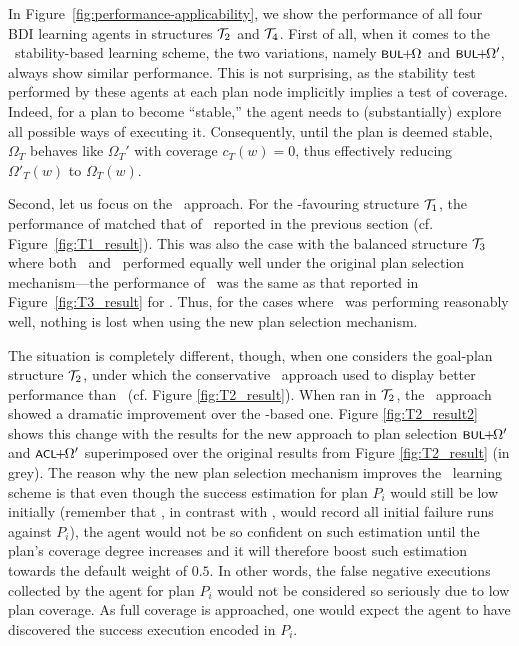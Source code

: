 In Figure~\ref{fig:performance-applicability}, we show the performance of all
four BDI learning agents in structures ${\mathcal{T}}_2$ and ${\mathcal{T}}_4$.
First of all, when it comes to the \BUL\ stability-based learning scheme, the
two variations, namely $\BULSELA$ and $\BULSELB$, always show similar
performance.
This is not surprising, as the stability test performed by these agents at each
plan node implicitly implies a test of coverage. Indeed, for a plan to become
``stable,'' the agent needs to (substantially) explore all possible  ways of
executing it. Consequently,  until the plan is deemed stable, $\Omega_T$ behaves
like $\Omega_T'$ with coverage $c_T(w)=0$, thus effectively reducing
$\Omega'_T(w)$ to $\Omega_T(w)$.



Second, let us focus on the \CL\ approach.
For the \CL-favouring structure ${\mathcal{T}}_1$, the performance of \CLSELB matched that
of \CLSELA\ reported in the previous section (cf. Figure~\ref{fig:T1_result}).
This was also the case with the balanced structure ${\mathcal{T}}_3$ where both \CL\ and
\BUL\ performed equally well under the original plan selection mechanism---the
performance of \CLSELB\ was the same as that reported in
Figure~\ref{fig:T3_result} for \CLSELA.
Thus, for the cases where \CL\ was performing reasonably well, nothing is lost
when using the new plan selection mechanism.



The situation is completely different, though, when one considers the goal-plan
structure ${\mathcal{T}}_2$, under which the conservative \BULSELA\ approach used to display
better performance than \CLSELA\ (cf. Figure \ref{fig:T2_result}).
When ran in ${\mathcal{T}}_2$, the \CLSELB\ approach showed a dramatic improvement over the
\CLSELA-based one. Figure \ref{fig:T2_result2} shows this change with the results
for the new approach to plan selection $\BULSELB$ and $\CLSELB$ superimposed over
the original results from Figure \ref{fig:T2_result} (in grey).
The reason why the new plan selection mechanism improves the \CL\ learning scheme
is that even though the success estimation for plan $P_i$ would still be low
initially (remember that \CL, in contrast with \BUL, would record all initial
failure runs against $P_i$), the agent would not be so confident on such
estimation until the plan's coverage degree increases and it will therefore boost
such estimation towards the default weight of $0.5$. In other words, the false
negative executions collected by the agent for plan $P_i$ would not be
considered so seriously due to low plan coverage. As full coverage is
approached, one would expect the agent to have discovered the success execution
encoded in $P_i$.



